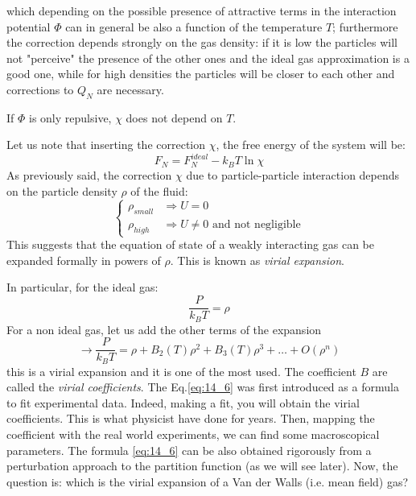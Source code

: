 \documentclass[../../Main/Main.tex]{subfiles}
\begin{document}
which depending on the possible presence of attractive terms in the interaction potential \( \Phi  \) can in general be also a function of the temperature \( T \);
furthermore the correction depends strongly on the gas density: if it is low the particles will not "perceive" the presence of the other ones and the ideal gas approximation is a good one, while for high densities the particles will be closer to each other and corrections to \( Q_N \) are necessary.
\begin{remark}
If \( \Phi  \) is only repulsive, \( \chi  \) does not depend on \( T \).
\end{remark}
Let us note that inserting the correction \( \chi  \), the free energy of the system will be:
\begin{equation}
  F_N = F_N^{ideal} - k_B T \ln{\chi }
\end{equation}
As previously said, the correction \( \chi  \) due to particle-particle interaction depends on the particle density \( \rho  \) of the fluid:
\begin{equation}
  \begin{cases}
   \rho _{small} &\Rightarrow  U = 0 \\
   \rho _{high} &\Rightarrow  U \neq 0 \text{ and not negligible}
  \end{cases}
\end{equation}
This suggests that the equation of state of a weakly interacting gas can be expanded formally in powers of \( \rho  \). This is known as \emph{virial expansion}.

In particular, for the ideal gas:
\begin{equation*}
  \frac{P}{k_B T} = \rho
\end{equation*}
For a non ideal gas, let us add the other terms of the expansion
\begin{equation}
  \rightarrow \frac{P}{k_B T} = \rho + B_2 (T) \rho ^2 + B_3 (T)\rho ^3+ \dots + O(\rho ^n)
  \label{eq:14_6}
\end{equation}
this is a virial expansion and it is one of the most used. The coefficient \( B \) are called the \emph{virial coefficients}.
The Eq.\eqref{eq:14_6} was first introduced as a formula to fit experimental data. Indeed, making a fit, you will obtain the virial coefficients. This is what physicist have done for years.  Then, mapping the coefficient with the real world experiments, we can find some macroscopical parameters.
The formula \eqref{eq:14_6} can be also obtained rigorously from a perturbation approach to the partition function (as we will see later). Now, the question is: which is the virial expansion of a Van der Walls (i.e. mean field) gas?
\end{document}
